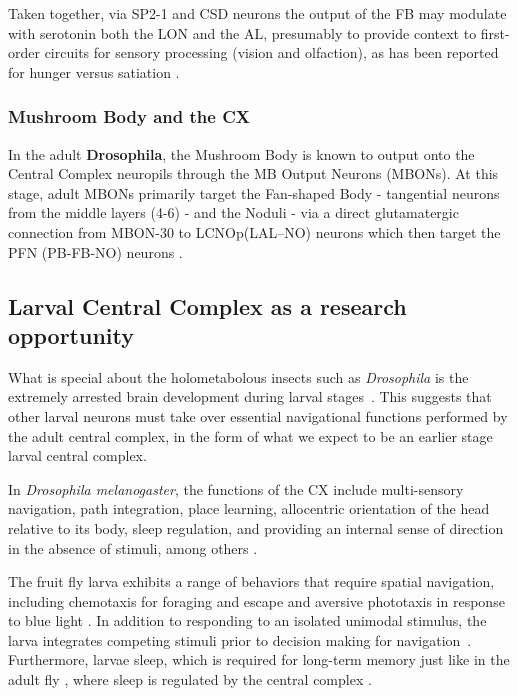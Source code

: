         Taken together, via SP2-1 and CSD neurons the output of the FB may modulate with serotonin both the LON and the AL, presumably to provide context to first-order circuits for sensory processing (vision and olfaction), as has been reported for hunger versus satiation \citep{vogt2021internalstate}.
        \subsubsection{Mushroom Body and the CX}
        In the adult \textbf{Drosophila}, the Mushroom Body is known to output onto the Central Complex neuropils through the MB Output Neurons (MBONs). At this stage, adult MBONs primarily target the Fan-shaped Body - tangential neurons from the middle layers (4-6) - and the Noduli - via a direct glutamatergic connection from MBON-30 to LCNOp(LAL–NO) neurons which then target the PFN (PB-FB-NO) neurons \citep{hulse2021connectome}.

\subsection{Larval Central Complex as a research opportunity}
    What is special about the holometabolous insects such as \textit{Drosophila} is the extremely arrested brain development during larval stages~\citep{andrade2019developmentally}. This suggests that other larval neurons must take over essential navigational functions performed by the adult central complex, in the form of what we expect to be an earlier stage larval central complex. 

    In \textit{Drosophila melanogaster}, the functions of the CX include multi-sensory navigation, path integration, place learning, allocentric orientation of the head relative to its body, sleep regulation, and providing an internal sense of direction in the absence of stimuli, among others \citep{hanesch1989neuronal, ofstad2011visual, seelig2013feature, PfeifferHomberg2014, Stone2017CXModel, franconville2018building, heinze2018principles, szuperak2018sleep, pisokas2020head, ShaferKeene2021sleep, fisher2022flexible}.

    The fruit fly larva exhibits a range of behaviors that require spatial navigation, including chemotaxis for foraging and escape \citep{fishilevich2005chemotaxis, khurana2013olfactory, Ebrahim2015OR49, davies2015model} and aversive phototaxis in response to blue light \citep{sawin1995phototaxis, gong2009phototaxis, KeeneSprecher2012photobehavior}.
    In addition to responding to an isolated unimodal stimulus, the larva integrates competing stimuli prior to decision making for navigation~\citep{gepner2015computations}.
    Furthermore, larvae sleep, which is required for long-term memory \citep{poe2023sleepmemory} just like in the adult fly \citep{donlea2011sleep, donlea2019sleep}, where sleep is regulated by the central complex \citep{ShaferKeene2021sleep}.

